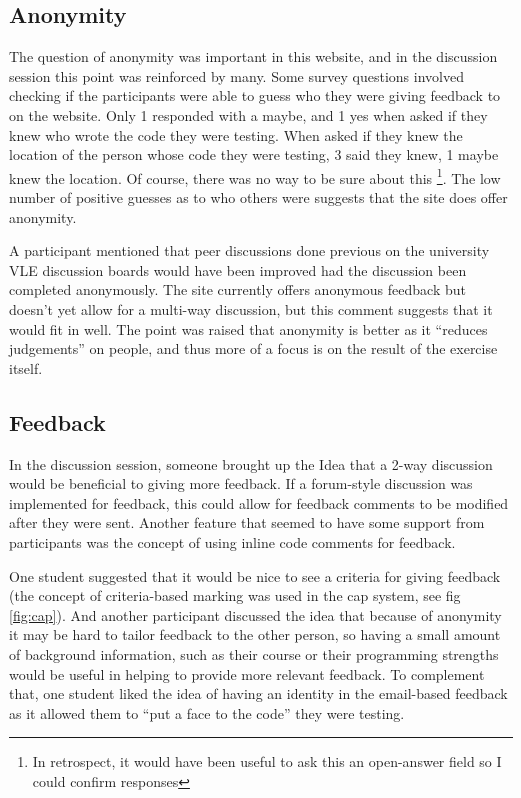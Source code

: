 \documentclass[a4paper,11pt]{report}
\begin{document}
\subsection{Anonymity}
The question of anonymity was important in this website, and in the discussion session this point was reinforced by many. Some survey questions involved checking if the participants were able to guess who they were giving feedback to on the website. Only 1 responded with a maybe, and 1 yes when asked if they knew who wrote the code they were testing. When asked if they knew the location of the person whose code they were testing, 3 said they knew, 1 maybe knew the location. Of course, there was no way to be sure about this \footnote{In retrospect, it would have been useful to ask this an open-answer field so I could confirm responses}. The low number of positive guesses as to who others were suggests that the site does offer anonymity.\par
A participant mentioned that peer discussions done previous on the university VLE discussion boards would have been improved had the discussion been completed anonymously. The site currently offers anonymous feedback but doesn't yet allow for a multi-way discussion, but this comment suggests that it would fit in well. The point was raised that anonymity is better as it ``reduces judgements'' on people, and thus more of a focus is on the result of the exercise itself.
\subsection{Feedback}
In the discussion session, someone brought up the Idea that a 2-way discussion would be beneficial to giving more feedback. If a forum-style discussion was implemented for feedback, this could allow for feedback comments to be modified after they were sent. Another feature that seemed to have some support from participants was the concept of using inline code comments for feedback.\par
One student suggested that it would be nice to see a criteria for giving feedback (the concept of criteria-based marking was used in the cap system, see fig \ref{fig:cap}). And another participant discussed the idea that because of anonymity it may be hard to tailor feedback to the other person, so having a small amount of background information, such as their course or their programming strengths would be useful in helping to provide more relevant feedback. To complement that, one student liked the idea of having an identity in the email-based feedback as it allowed them to ``put a face to the code'' they were testing.\par
\end{document}
